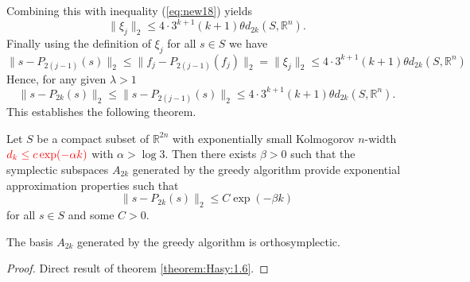 Combining this with inequality (\ref{eq:new18}) yields
\begin{equation} \label{eq:new20}
	\| \xi_j \|_2 \leq 4\cdot 3^{k+1} (k+1) \theta d_{2k}(S,\mathbb R^n).
\end{equation}
Finally using the definition of $\xi_j$ for all $s\in S$ we have
\begin{equation} \label{eq:new21}
	\| s - P_{2(j-1)}(s) \|_2 \leq \| f_j - P_{2(j-1)}(f_j) \|_2 = \|\xi_j \|_2 \leq 4\cdot 3^{k+1} (k+1) \theta d_{2k}(S,\mathbb R^n)
\end{equation}
Hence, for any given $\lambda > 1$
\begin{equation} \label{eq:new22}
	\| s - P_{2k}(s) \|_2 \leq \| s - P_{2(j-1)}(s) \|_2 \leq 4\cdot 3^{k+1} (k+1) \theta d_{2k}(S,\mathbb R^n).
\end{equation}
This establishes the following theorem.
\begin{theorem}
	Let $S$ be a compact subset of $\mathbb{R}^{2n}$ with exponentially small Kolmogorov $n$-width $\color{red} d_{k}\leq c\exp(-\alpha k)$ with $\alpha > \log3$. Then there exists $\beta>0$ such that the symplectic subspaces $A_{2k}$ generated by the greedy algorithm provide exponential approximation properties such that
\begin{equation} \label{eq:new23}
	\| s - P_{2k}(s) \|_2 \leq C \exp(-\beta k)
\end{equation}
for all $s\in S$ and some $C>0$.
\end{theorem}

{\edit
\begin{theorem}
	The basis $A_{2k}$ generated by the greedy algorithm is orthosymplectic.
\end{theorem}
\begin{proof}
	Direct result of theorem \ref{theorem:Hasy:1.6}.
\end{proof}
}

